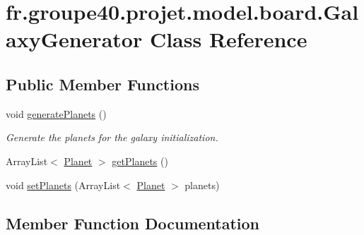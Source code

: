 \hypertarget{classfr_1_1groupe40_1_1projet_1_1model_1_1board_1_1_galaxy_generator}{}\section{fr.\+groupe40.\+projet.\+model.\+board.\+Galaxy\+Generator Class Reference}
\label{classfr_1_1groupe40_1_1projet_1_1model_1_1board_1_1_galaxy_generator}
\subsection*{Public Member Functions}
\begin{DoxyCompactItemize}
\item 
\mbox{\label{classfr_1_1groupe40_1_1projet_1_1model_1_1board_1_1_galaxy_generator_a7af2998c5098fa02bf6dfd0c794dfe2d}} 
void \mbox{\hyperlink{classfr_1_1groupe40_1_1projet_1_1model_1_1board_1_1_galaxy_generator_a7af2998c5098fa02bf6dfd0c794dfe2d}{generate\+Planets}} ()
\begin{DoxyCompactList}\small\item\em Generate the planets for the galaxy initialization. \end{DoxyCompactList}\item 
Array\+List$<$ \mbox{\hyperlink{classfr_1_1groupe40_1_1projet_1_1model_1_1planets_1_1_planet}{Planet}} $>$ \mbox{\hyperlink{classfr_1_1groupe40_1_1projet_1_1model_1_1board_1_1_galaxy_generator_a025a232f305b1465f38a73fac918dbb5}{get\+Planets}} ()
\item 
void \mbox{\hyperlink{classfr_1_1groupe40_1_1projet_1_1model_1_1board_1_1_galaxy_generator_a67bac9f8bd2561972535ec64c63340ce}{set\+Planets}} (Array\+List$<$ \mbox{\hyperlink{classfr_1_1groupe40_1_1projet_1_1model_1_1planets_1_1_planet}{Planet}} $>$ planets)
\end{DoxyCompactItemize}


\subsection{Member Function Documentation}
\mbox{\label{classfr_1_1groupe40_1_1projet_1_1model_1_1board_1_1_galaxy_generator_a025a232f305b1465f38a73fac918dbb5}} 
